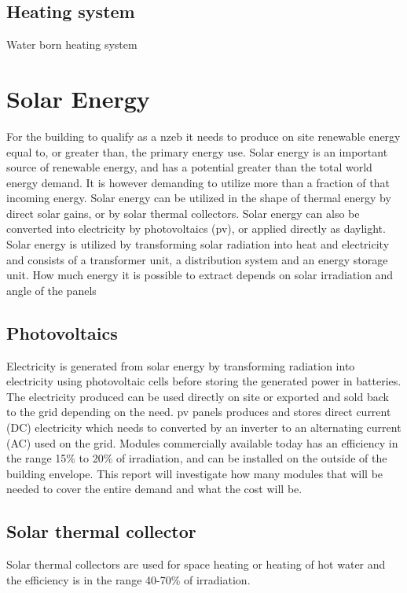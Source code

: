 \subsection*{Heating system}
Water born heating system

\section{Solar Energy}
For the building to qualify as a \ac{nzeb} it needs to produce on site renewable energy equal to, or greater than, the primary energy use. Solar energy is an important source of renewable energy, and has a potential greater than the total world energy demand. It is however demanding to utilize more than a fraction of that incoming energy. Solar energy can be utilized in the shape of thermal energy by direct solar gains, or by solar thermal collectors. Solar energy can also be converted into electricity by photovoltaics (\ac{pv}), or applied directly as daylight. Solar energy is utilized by transforming solar radiation into heat and electricity and consists of a transformer unit, a distribution system and an energy storage unit. How much energy it is possible to extract depends on solar irradiation and angle of the panels

\subsection{Photovoltaics}
Electricity is generated from solar energy by transforming radiation into electricity using photovoltaic cells before storing the generated power in batteries. The electricity produced can be used directly on site or exported and sold back to the grid depending on the need. \ac{pv} panels produces and stores direct current (DC) electricity which needs to converted by an inverter to an alternating current (AC) used on the grid. Modules commercially available today has an efficiency in the range 15\% to 20\% of irradiation, and can be installed on the outside of the building envelope. This report will investigate how many modules that will be needed to cover the entire demand and what the cost will be. 

\subsection{Solar thermal collector}
Solar thermal collectors are used for space heating or heating of hot water and the efficiency is in the range 40-70\% of irradiation. 

